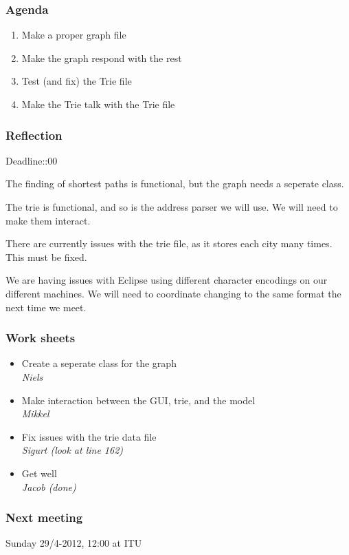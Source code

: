 \documentclass[a4paper,11pt]{article}
\begin{document}
\subsubsection*{Agenda}
\begin{enumerate}
	\item Make a proper graph file
	\item Make the graph respond with the rest
	\item Test (and fix) the Trie file
	\item Make the Trie talk with the Trie file
\end{enumerate}

\subsubsection*{Reflection}
Deadline::00

The finding of shortest paths is functional, but the graph needs a seperate class.

The trie is functional, and so is the address parser we will use. We will need to make them interact.

There are currently issues with the trie file, as it stores each city many times. This must be fixed.

We are having issues with Eclipse using different character encodings on our different machines. We will need to coordinate changing to the same format the next time we meet.

\subsubsection*{Work sheets}
\begin{itemize}
	\item Create a seperate class for the graph \\
		\textsl{Niels}
	\item Make interaction between the GUI, trie, and the model \\
		\textsl{Mikkel}
	\item Fix issues with the trie data file \\
		\textsl{Sigurt (look at line 162)}
	\item Get well \\
		\textsl{Jacob (done)}
\end{itemize}

\subsubsection*{Next meeting}
Sunday 29/4-2012, 12:00 at ITU
\end{document}
